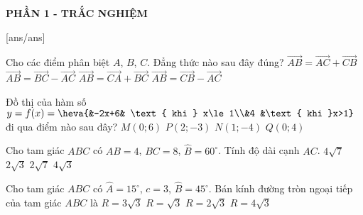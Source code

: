 
\begin{center}
	\textbf{PHẦN 1 - TRẮC NGHIỆM}
\end{center}
[ans/ans]

\begin{ex}%
	Cho các điểm phân biệt $A$, $B$, $C$. Đẳng thức nào sau đây đúng?
	\choice
	{\True $\overrightarrow{AB}=\overrightarrow{AC}+\overrightarrow{CB}$}
	{$\overrightarrow{AB}=\overrightarrow{BC}-\overrightarrow{AC}$}
	{$\overrightarrow{AB}=\overrightarrow{CA}+\overrightarrow{BC}$}
	{$\overrightarrow{AB}=\overrightarrow{CB}-\overrightarrow{AC}$}
\end{ex}
\begin{ex}%
	Đồ thị của hàm số $y=f(x)=\heva{&-2x+6& \text{ khi } x\le 1\\&4 &\text{ khi }x>1}$ đi qua điểm nào sau đây?
	\choice
	{\True $M\left(0;6\right)$}
	{$P\left(2;-3\right)$}
	{$N\left(1;-4\right)$}
	{$Q\left(0;4\right)$}
\end{ex}
\begin{ex}%
	Cho tam giác $ABC$ có $AB=4$, $BC=8$, $\widehat{B}=60^\circ$. Tính độ dài cạnh $AC$.
	\choice
	{$4\sqrt{7}$}
	{$2\sqrt{3}$}
	{$2\sqrt{7}$}
	{\True $4\sqrt{3}$}
\end{ex}
\begin{ex}%
	Cho tam giác $ABC$ có $\widehat{A}=15^\circ$, $c=3$, $\widehat{B}=45^\circ$. Bán kính đường tròn ngoại tiếp của tam giác $ABC$ là
	\choice
	{$R=3\sqrt{3}$}
	{\True $R=\sqrt{3}$}
	{$R=2\sqrt{3}$}
	{$R=4\sqrt{3}$}
\end{ex}
